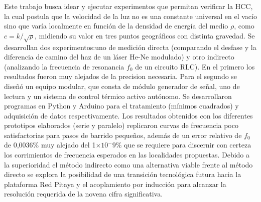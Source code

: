 \documentclass[pregrado]{tesis-usb}
\begin{document}
\begin{resumen}
Este trabajo busca idear y ejecutar experimentos que permitan verificar la \ac{HCC}, la cual postula que la velocidad de la luz no es una constante universal en el vacío sino que varía localmente en función de la densidad de energía del medio $\rho$, como $c=k/\sqrt{\rho}$, midiendo su valor en tres puntos geográficos con distinta gravedad. Se desarrollan dos experimentos:uno de medición directa (comparando el desfase y la diferencia de camino del haz de un láser He-Ne modulado) y otro indirecto (analizando la frecuencia de resonancia $f_0$ de un circuito RLC). En el primero los resultados fueron muy alejados de la precision necesaria. Para el segundo se diseñó un equipo modular, que consta de módulo generador de señal, uno de lectura y un sistema de control térmico activo autónomo. Se desarrollaron programas en Python y Arduino para el tratamiento (mínimos cuadrados) y adquisición de datos respectivamente. Los resultados obtenidos con los diferentes prototipos elaborados (serie y paralelo) replicaron curvas de frecuencia poco satisfactorias para pasos de barrido pequeños, además de un error relativo de $f_0$ de 0,0036\% muy alejado del 1$\times 10^-9$\%  que se requiere para discernir con certeza los corrimientos de frecuencia esperados en las localidades propuestas. Debido a la superioridad el método indirecto como una alternativa viable frente al método directo se explora la posibilidad de una transición tecnológica futura hacia la plataforma Red Pitaya y el acoplamiento por inducción para alcanzar la resolución requerida de la novena cifra significativa.


\end{resumen}
\end{document}
